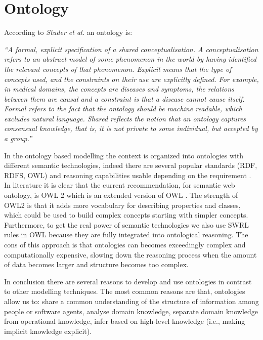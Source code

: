 \documentclass{thesisreport}
\begin{document}
\section{Ontology} \label{ontology}

According to \textit{Studer et al.} \cite{studer1998knowledge} an ontology is: 
\begin{center}
\textit{``A formal, explicit specification of a shared conceptualisation. A conceptualisation refers to an abstract model of some phenomenon in the world by having identified the relevant concepts of that phenomenon. Explicit means that the type of concepts used, and the constraints on their use are explicitly defined. For example, in medical domains, the concepts are diseases and symptoms, the relations between them are causal and a constraint is that a disease cannot cause itself. Formal refers to the fact that the ontology should be machine readable, which excludes natural language. Shared reflects the notion that an ontology captures consensual knowledge, that is, it is not private to some individual, but accepted by a group.”}
\end{center}

In the ontology based modelling the context is organized into ontologies with different semantic technologies, indeed there are several popular standards (RDF, RDFS, OWL) and reasoning capabilities usable depending on the requirement \cite{perera2014context}. 
In literature it is clear that the current recommendation, for semantic web ontology, is OWL 2 which is an extended version of OWL \cite{perera2014context}. The strength of OWL2 is that it adds more vocabulary for describing properties and classes, which could be used to build complex concepts starting with simpler concepts.
Furthermore, to get the real power of semantic technologies we also use SWRL rules in OWL because they are fully integrated into ontological reasoning. The cons of this approach is that ontologies can becomes exceedingly complex and computationally expensive, slowing down the reasoning process when the amount of data becomes larger and structure becomes too complex.

In conclusion there are several reasons to develop and use ontologies in contrast to other modelling techniques. The most common reasons are that, ontologies allow us to: share a common understanding of the structure of information among people or software agents, analyse domain knowledge, separate domain knowledge from operational knowledge, infer based on high-level knowledge (i.e., making implicit knowledge explicit).
\end{document}
